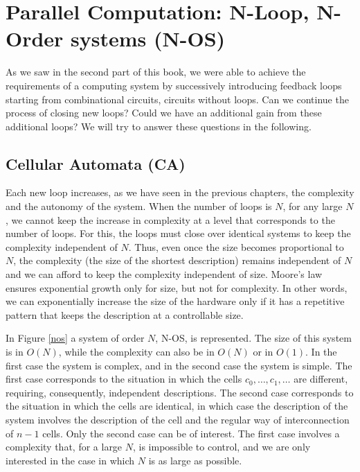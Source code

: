 \chapter{Parallel Computation: N-Loop, N-Order systems (N-OS)}\label{lect6b}
\localtoc

As we saw in the second part of this book, we were able to achieve the requirements of a computing system by successively introducing feedback loops starting from combinational circuits, circuits without loops. Can we continue the process of closing new loops? Could we have an additional gain from these additional loops? We will try to answer these questions in the following.

\section{Cellular Automata (CA)}

Each new loop increases, as we have seen in the previous chapters, the complexity and the autonomy of the system. When the number of loops is $N$, for any large $N$, we cannot keep the increase in complexity at a level that corresponds to the number of loops. For this, the loops must close over identical systems to keep the complexity independent of $N$. Thus, even once the size becomes proportional to $N$, the complexity (the size of the shortest description) remains independent of $N$ and we can afford to keep the complexity independent of size. Moore's law ensures exponential growth only for size, but not for complexity. In other words, we can exponentially increase the size of the hardware only if it has a repetitive pattern that keeps the description at a controllable size.


In Figure \ref{nos} a system of order $N$, N-OS, is represented. The size of this system is in $O(N)$, while the complexity can also be in $O(N)$ or in $O(1)$. In the first case the system is complex, and in the second case the system is simple. The first case corresponds to the situation in which the cells $c_0, \ldots, c_1, \ldots$ are different, requiring, consequently, independent descriptions. The second case corresponds to the situation in which the cells are identical, in which case the description of the system involves the description of the cell and the regular way of interconnection of $n-1$ cells. Only the second case can be of interest. The first case involves a complexity that, for a large $N$, is impossible to control, and we are only interested in the case in which $N$ is as large as possible. 

